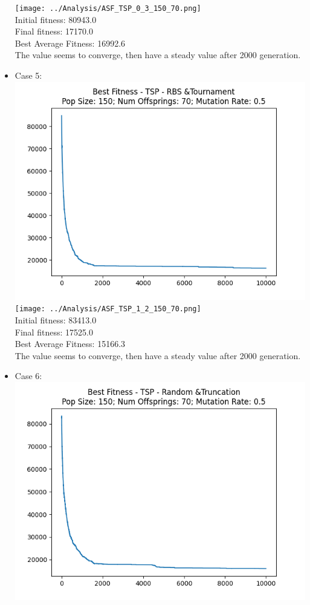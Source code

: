 \documentclass[12pt]{report} %
\begin{document}
\begin{itemize}
	      \texttt{[image: ../Analysis/ASF\_TSP\_0\_3\_150\_70.png]}
	      \\Initial fitness:  80943.0
	      \\Final fitness:  17170.0
	      \\Best Average Fitness: 16992.6
	      \\The value seems to converge, then have a steady value after 2000 generation.
	\item Case 5:\\
	      \includegraphics[scale=0.5]{../Analysis/BSF_TSP_1_2_150_70.png}
	      \texttt{[image: ../Analysis/ASF\_TSP\_1\_2\_150\_70.png]}
	      \\Initial fitness:  83413.0
	      \\Final fitness:  17525.0
	      \\Best Average Fitness: 15166.3
	      \\The value seems to converge, then have a steady value after 2000 generation.
	\item Case 6:\\
	      \includegraphics[scale=0.5]{../Analysis/BSF_TSP_4_3_150_70.png}

\end{itemize}
\end{document}
